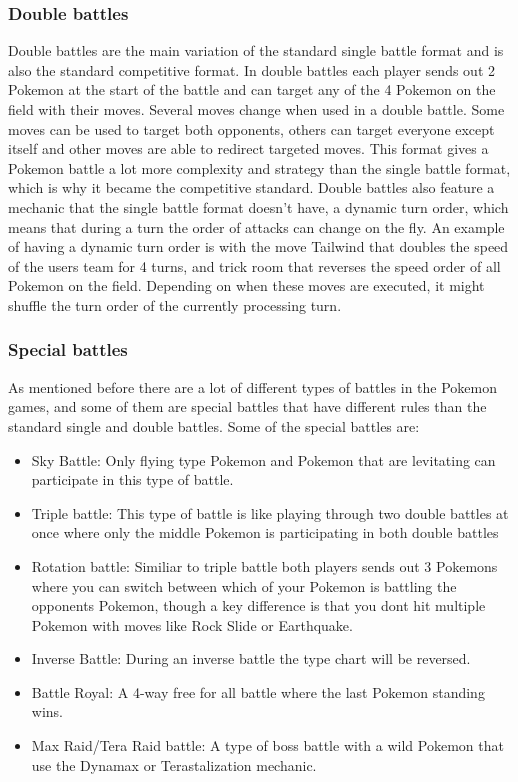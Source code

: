 \subsubsection{Double battles}
Double battles are the main variation of the standard single battle format and is also the standard competitive format. In double battles 
each player sends out 2 Pokemon at the start of the battle and can target any of the 4 Pokemon on the field with their moves. Several moves change 
when used in a double battle. Some moves can be used to target both opponents, others can target everyone except itself and other moves are able to redirect targeted moves.
This format gives a Pokemon battle a lot more complexity and strategy than the single battle format, which is why it became the competitive standard.
Double battles also feature a mechanic that the single battle format doesn't have, a dynamic turn order, which means that during a turn the order of attacks 
can change on the fly. An example of having a dynamic turn order is with the move Tailwind that doubles the speed of the users team for 
4 turns, and trick room that reverses the speed order of all Pokemon on the field. Depending on when these moves are executed, it might shuffle the turn order
of the currently processing turn. \cite{PokemonBattles}

\subsubsection{Special battles}
As mentioned before there are a lot of different types of battles in the Pokemon games, and some of them are special battles that have different rules
than the standard single and double battles. Some of the special battles are: \cite{PokemonBattles}
\begin{itemize}
  \item Sky Battle: Only flying type Pokemon and Pokemon that are levitating can participate in this type of battle.
  \item Triple battle: This type of battle is like playing through two double battles at once where only the middle Pokemon is participating 
    in both double battles
  \item Rotation battle: Similiar to triple battle both players sends out 3 Pokemons where you can switch between which of your Pokemon is battling
    the opponents Pokemon, though a key difference is that you dont hit multiple Pokemon with moves like Rock Slide or Earthquake. 
  \item Inverse Battle: During an inverse battle the type chart will be reversed.
  \item Battle Royal: A 4-way free for all battle where the last Pokemon standing wins.
  \item Max Raid/Tera Raid battle: A type of boss battle with a wild Pokemon that use the 
  Dynamax or Terastalization mechanic.
\end{itemize}

